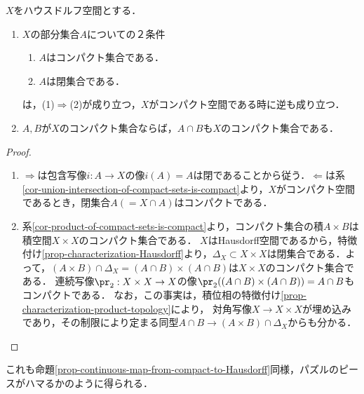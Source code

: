 \documentclass[uplatex,dvipdfmx]{jsreport}
\begin{document}
\begin{proposition}[Hausdorff空間内でのコンパクト集合]\label{prop-compact-set-in-Hausdorff-spaces}
    $X$をハウスドルフ空間とする．
    \begin{enumerate}
        \item $X$の部分集合$A$についての２条件
        \begin{enumerate}[(1)]
            \item $A$はコンパクト集合である．
            \item $A$は閉集合である．
        \end{enumerate}
        は，(1)$\Rightarrow$(2)が成り立つ，$X$がコンパクト空間である時に逆も成り立つ．
        \item $A,B$が$X$のコンパクト集合ならば，$A\cap B$も$X$のコンパクト集合である．
    \end{enumerate}
\end{proposition}
\begin{proof}\mbox{}
    \begin{enumerate}
        \item $\Rightarrow$は包含写像$i:A\to X$の像$i(A)=A$は閉であることから従う．$\Leftarrow$は系\ref{cor-union-intersection-of-compact-sets-is-compact}より，$X$がコンパクト空間であるとき，閉集合$A(=X\cap A)$はコンパクトである．
        \item 系\ref{cor-product-of-compact-sets-is-compact}より，コンパクト集合の積$A\times B$は積空間$X\times X$のコンパクト集合である．
        $X$はHausdorff空間であるから，特徴付け\ref{prop-characterization-Hausdorff}より，$\Delta_X\subset X\times X$は閉集合である．よって，$(A\times B)\cap\Delta_X=(A\cap B)\times(A\cap B)$は$X\times X$のコンパクト集合である．
        連続写像$\pr_2:X\times X\to X$の像$\pr_2((A\cap B)\times (A\cap B))=A\cap B$もコンパクトである．
        なお，この事実は，積位相の特徴付け\ref{prop-characterization-product-topology}により，
        対角写像$X\to X\times X$が埋め込みであり，その制限により定まる同型$A\cap B\to(A\times B)\cap\Delta_X$からも分かる．
    \end{enumerate}
\end{proof}
\begin{remarks}
    これも命題\ref{prop-continuous-map-from-compact-to-Hausdorff}同様，パズルのピースがハマるかのように得られる．
\end{remarks}
\end{document}
